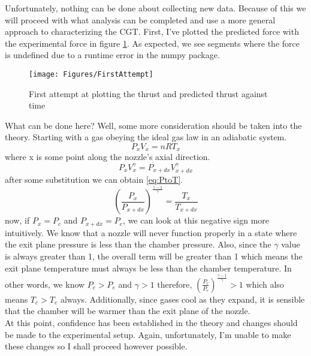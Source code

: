 Unfortunately, nothing can be done about collecting new data. Because of this we will proceed with what analysis can be completed and use a more general approach to characterizing the CGT. First, I've plotted the predicted force with the experimental force in figure \ref{fig:FirstThrust}. As expected, we see segments where the force is undefined due to a runtime error in the numpy package.
\begin{figure}[h!]
\centering
\texttt{[image: Figures/FirstAttempt]}
\caption{First attempt at plotting the thrust and predicted thrust against time}
\label{fig:FirstThrust}
\end{figure}
What can be done here? Well, some more consideration should be taken into the theory. Starting with a gas obeying the ideal gas law in an adiabatic system.
\begin{equation}\label{eq:IGL}
P_xV_x=nRT_x
\end{equation}
where x is some point along the nozzle's axial direction.
\begin{equation}\label{eq:Adiabat}
P_xV_x^{\gamma}=P_{x+dx}V_{x+dx}^{\gamma}
\end{equation}
after some substitution we can obtain \ref{eq:PtoT}.
\begin{equation}\label{eq:PtoT}
\left(\frac{P_x}{P_{x+dx}}\right)^{\frac{\gamma-1}{\gamma}}=\frac{T_x}{T_{x+dx}}
\end{equation}
now, if $P_x=P_c$ and $P_{x+dx}=P_e$, we can look at this negative sign more intuitively. We know that a nozzle will never function properly in a state where the exit plane pressure is less than the chamber pressure. Also, since the $\gamma$ value is always greater than 1, the overall term will be greater than 1 which means the exit plane temperature must always be less than the chamber temperature. In other words, we know $P_c>P_e$ and $\gamma>1$ therefore, $\left(\frac{P_c}{P_e}\right)^{\frac{\gamma-1}{\gamma}}>1$ which also means $T_c>T_e$ always. Additionally, since gases cool as they expand, it is sensible that the chamber will be warmer than the exit plane of the nozzle.\\
At this point, confidence has been established in the theory and changes should be made to the experimental setup. Again, unfortunately, I'm unable to make these changes so I shall proceed however possible.
